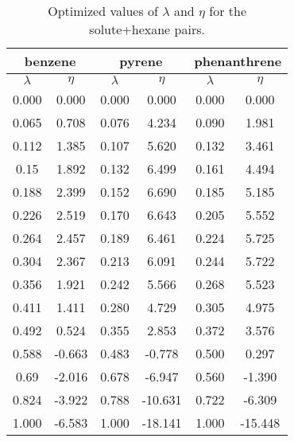 \documentclass[preprint,12p,times]{elsarticle}
\begin{document}
	\begin{table}[h]
		\centering
		\caption{Optimized values of $\lambda $ and $\eta $ for the solute+hexane pairs.}
		\label{tbl:lambdahex}
		\begin{tabular}{cccccc}
			\hline\hline
			\multicolumn{2}{c}{benzene}&\multicolumn{2}{c}{pyrene}& \multicolumn{2}{c}{phenanthrene}\\
			\hline\hline
			$\lambda$ & $\eta$& $\lambda$ & $\eta$  & $\lambda$ & $\eta$   \\ 
			\hline\hline
			0.000     &0.000      & 0.000    &    0.000    &    0.000    &    0.000    \\
			0.065     &0.708  & 0.076    &    4.234    &    0.090    &    1.981    \\
			0.112     &1.385  & 0.107    &    5.620    &    0.132    &    3.461    \\
			0.15      &1.892  & 0.132    &    6.499    &    0.161    &    4.494    \\
			0.188     &2.399  & 0.152    &    6.690    &    0.185    &    5.185    \\
			0.226     &2.519  & 0.170    &    6.643    &    0.205    &    5.552    \\
			0.264     &2.457  & 0.189    &    6.461    &    0.224    &    5.725    \\
			0.304     &2.367  & 0.213    &    6.091    &    0.244    &    5.722    \\
			0.356     &1.921  & 0.242    &    5.566    &    0.268    &    5.523    \\
			0.411     &1.411  & 0.280    &    4.729    &    0.305    &    4.975    \\
			0.492     &0.524  & 0.355    &    2.853    &    0.372    &    3.576    \\
			0.588     &-0.663 & 0.483    &    -0.778    &    0.500    &    0.297    \\
			0.69      &-2.016 & 0.678    &    -6.947    &    0.560    &    -1.390    \\
			0.824     &-3.922 & 0.788    &    -10.631    &    0.722    &    -6.309    \\
			1.000         &-6.583  &1.000      &    -18.141    &    1.000    &    -15.448    \\
			\hline\hline   
		\end{tabular}
	\end{table}
\end{document}
